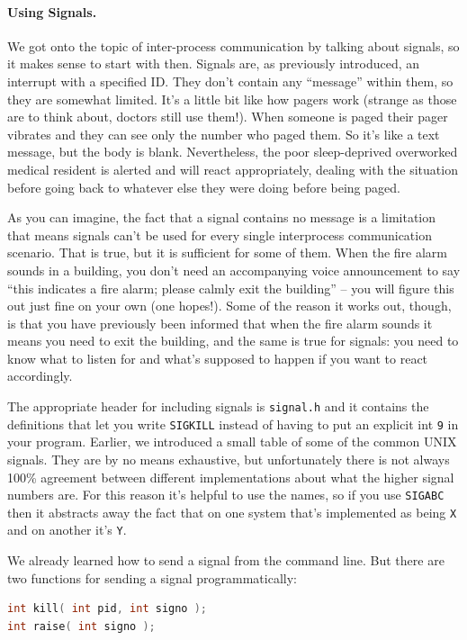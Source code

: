 \paragraph{Using Signals.} We got onto the topic of inter-process communication by talking about signals, so it makes sense to start with then. Signals are, as previously introduced, an interrupt with a specified ID. They don't contain any ``message'' within them, so they are somewhat limited. It's a little bit like how pagers work (strange as those are to think about, doctors still use them!). When someone is paged their pager vibrates and they can see only the number who paged them. So it's like a text message, but the body is blank. Nevertheless, the poor sleep-deprived overworked medical resident is alerted and will react appropriately, dealing with the situation before going back to whatever else they were doing before being paged.

As you can imagine, the fact that a signal contains no message is a limitation that means signals can't be used for every single interprocess communication scenario. That is true, but it is sufficient for some of them. When the fire alarm sounds in a building, you don't need an accompanying voice announcement to say ``this indicates a fire alarm; please calmly exit the building'' -- you will figure this out just fine on your own (one hopes!). Some of the reason it works out, though, is that you have previously been informed that when the fire alarm sounds it means you need to exit the building, and the same is true for signals: you need to know what to listen for and what's supposed to happen if you want to react accordingly.

The appropriate header for including signals is \texttt{signal.h} and it contains the definitions that let you write \texttt{SIGKILL} instead of having to put an explicit int \texttt{9} in your program.  Earlier, we introduced a small table of some of the common UNIX signals. They are by no means exhaustive, but unfortunately there is not always 100\% agreement between different implementations about what the higher signal numbers are. For this reason it's helpful to use the names, so if you use \texttt{SIGABC} then it abstracts away the fact that on one system that's implemented as being \texttt{X} and on another it's \texttt{Y}.

We already learned how to send a signal from the command line. But there are two functions for sending a signal programmatically:

\begin{lstlisting}[language=C]
int kill( int pid, int signo );
int raise( int signo );
\end{lstlisting}

